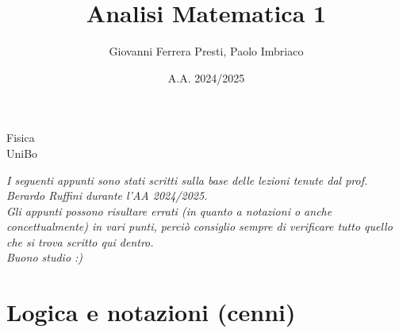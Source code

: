 \documentclass{article}
\title{Analisi Matematica 1}
\author{Giovanni Ferrera Presti, Paolo Imbriaco }
\date{A.A. 2024/2025}
\theoremstyle{definition}
\begin{document}
\maketitle
 \vfill
 \begin{center}
       Fisica\\
       UniBo\\
    \end{center}
\newpage
\begin{center}
\textit{I seguenti appunti sono stati scritti sulla base delle lezioni tenute dal prof. Berardo Ruffini durante l'AA 2024/2025. \\ 
Gli appunti possono risultare errati (in quanto a notazioni o anche concettualmente) in vari punti, perciò consiglio sempre di verificare tutto quello che si trova scritto qui dentro.\\ 
Buono studio :)}
\end{center}
\newpage
\tableofcontents
\newpage
\section{Logica e notazioni (cenni)}
\end{document}
